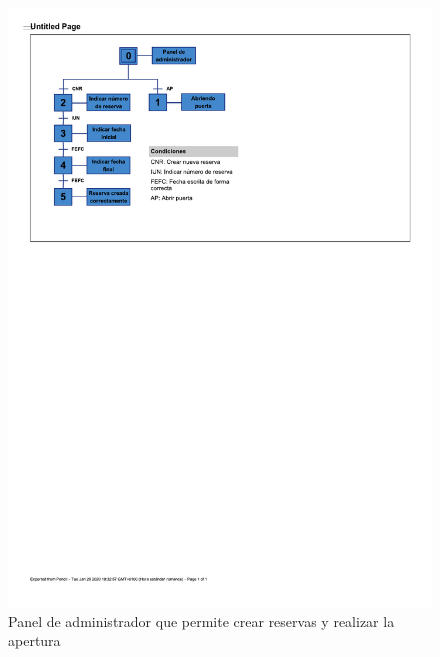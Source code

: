 \begin{figure}[tbp]
\centering
\includegraphics[scale=1]{fig/Grafcet_reserva_y_apertura.pdf}
\caption{Panel de administrador que permite crear reservas y realizar la apertura}
\label{fig:reserva-y-apertura}
\end{figure}

